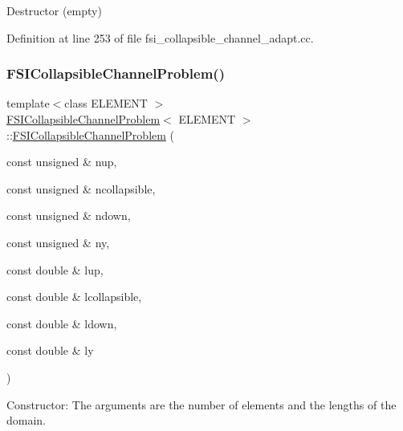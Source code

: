 Destructor (empty) 



Definition at line 253 of file fsi\+\_\+collapsible\+\_\+channel\+\_\+adapt.\+cc.

\mbox{\label{classFSICollapsibleChannelProblem_afe14ae0d2bdfc9a15969c9bdcd6e2512}} 
\subsubsection{\texorpdfstring{F\+S\+I\+Collapsible\+Channel\+Problem()}{FSICollapsibleChannelProblem()}\hspace{0.1cm}{\footnotesize\ttfamily [3/4]}}
{\footnotesize\ttfamily template$<$class E\+L\+E\+M\+E\+NT $>$ \\
\hyperlink{classFSICollapsibleChannelProblem}{F\+S\+I\+Collapsible\+Channel\+Problem}$<$ E\+L\+E\+M\+E\+NT $>$\+::\hyperlink{classFSICollapsibleChannelProblem}{F\+S\+I\+Collapsible\+Channel\+Problem} (\begin{DoxyParamCaption}\item[{const unsigned \&}]{nup,  }\item[{const unsigned \&}]{ncollapsible,  }\item[{const unsigned \&}]{ndown,  }\item[{const unsigned \&}]{ny,  }\item[{const double \&}]{lup,  }\item[{const double \&}]{lcollapsible,  }\item[{const double \&}]{ldown,  }\item[{const double \&}]{ly }\end{DoxyParamCaption})}



Constructor\+: The arguments are the number of elements and the lengths of the domain. 

\mbox{\label{classFSICollapsibleChannelProblem_abe33aaaae15ea3eb10885527a1d1ad9a}} 
